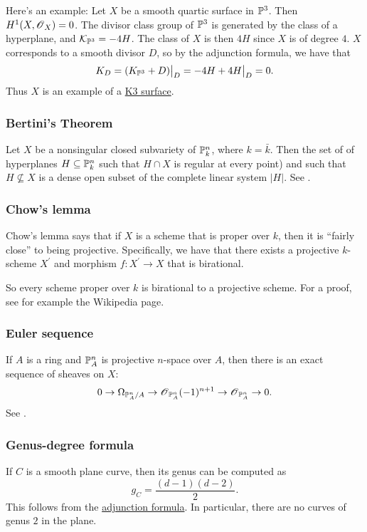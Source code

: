\documentclass[11pt, english]{article}
\begin{document}
Here's an example: Let $X$ be a smooth quartic surface in $\mathbb{P}^3$. Then $H^1(X,\operatorname{\mathscr{O}}_X)=0$. The divisor class group of $\mathbb{P}^3$ is generated by the class of a hyperplane, and $\mathcal K_{\mathbb{P}^3}=-4H$. The class of $X$ is then $4H$ since $X$ is of degree $4$. $X$ corresponds to a smooth divisor $D$, so by the adjunction formula, we have that
\[
K_D = \restr{(K_{\PP^3}+D)}{D} = \restr{-4H+4H}{D} = 0.
\]
Thus $X$ is an example of a \hyperref[k3]{K3 surface}. 


\subsubsection{Bertini's Theorem}
\label{bertini}
Let $X$ be a nonsingular closed subvariety of $\mathbb{P}_k^n$, where $k=\bar k$. Then the set of of hyperplanes $H \subseteq \mathbb{P}_k^n$ such that $H \cap X$ is regular at every point) and such that $H\not  \subseteq X$ is a dense open subset of the complete linear system $|H|$. See \cite[Thm II.8.18]{hartshorne}.

\subsubsection{Chow's lemma}
\label{chowslemma}

Chow's lemma says that if $X$ is a scheme that is proper over $k$, then it is ``fairly close'' to being projective. Specifically, we have that there exists a projective $k$-scheme $X^\prime$ and morphism $f:X^\prime \to X$ that is birational.

So every scheme proper over $k$ is birational to a projective scheme. For a proof, see for example the Wikipedia page.

\subsubsection{Euler sequence}
\label{eulersequence}
If $A$ is a ring and $\mathbb{P}_A^n$ is projective $n$-space over $A$, then there is an exact sequence of sheaves on $X$:
\[
0 \to \Omega_{\mathbb{P}^n_A/A} \to \operatorname{\mathscr{O}}_{\mathbb{P}^n_A}(-1)^{n+1} \to \operatorname{\mathscr{O}}_{\mathbb{P}_A^n} \to 0.
\]
See \cite[Thm II.8.13]{hartshorne}.

\subsubsection{Genus-degree formula}
\label{genusdegree}

If $C$ is a smooth plane curve, then its genus can be computed as
\[
g_C = \frac{(d-1)(d-2)}{2}.
\]
This follows from the \hyperref[adjunction]{adjunction formula}. In particular, there are no curves of genus $2$ in the plane.
\end{document}
